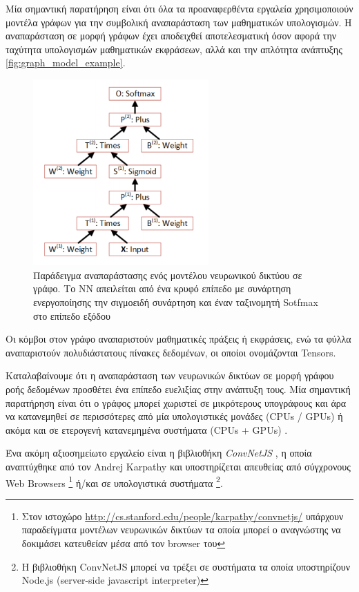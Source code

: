 Μία σημαντική παρατήρηση είναι ότι όλα τα προαναφερθέντα εργαλεία χρησιμοποιούν μοντέλα γράφων
για την συμβολική αναπαράσταση των μαθηματικών υπολογισμών. Η αναπαράσταση σε μορφή γράφων
έχει αποδειχθεί αποτελεσματική όσον αφορά την ταχύτητα υπολογισμών μαθηματικών εκφράσεων, αλλά και την
απλότητα ανάπτυξης \autoref{fig:graph_model_example}.

\begin{figure}[!ht]
  \centering
  \includegraphics[width=0.6\textwidth]{./images/chapter4/graph_model_example.png}
  \caption[Παράδειγμα αναπαράστασης ενός μοντέλου νευρωνικού δικτύου σε γράφο.
    Το ΝΝ αποτλείται από ένα κρυφό επίπεδο
    και ένα ταξινομητή Sotfmax στο επίπεδο εξόδου]{
    Παράδειγμα αναπαράστασης ενός μοντέλου νευρωνικού δικτύου σε γράφο.
    Το ΝΝ απειλείται από ένα κρυφό επίπεδο με συνάρτηση ενεργοποίησης την σιγμοειδή συνάρτηση
    και έναν ταξινομητή Sotfmax στο επίπεδο εξόδου}
  \label{fig:graph_model_example}
\end{figure}
Οι κόμβοι στον γράφο αναπαριστούν μαθηματικές πράξεις ή εκφράσεις, ενώ τα φύλλα
αναπαριστούν πολυδιάστατους πίνακες δεδομένων, οι οποίοι ονομάζονται Tensors.

Καταλαβαίνουμε ότι η αναπαράσταση των νευρωνικών δικτύων σε μορφή γράφου ροής
δεδομένων προσθέτει ένα επίπεδο ευελιξίας στην ανάπτυξη τους. Μία σημαντική παρατήρηση
είναι ότι ο γράφος μπορεί χωριστεί σε μικρότερους υπογράφους και άρα να κατανεμηθεί
σε περισσότερες από μία υπολογιστικές μονάδες (CPUs / GPUs) ή ακόμα και
σε ετερογενή κατανεμημένα συστήματα (CPUs + GPUs) \cite{DBLP:journals/corr/AbadiABBCCCDDDG16} .

Ένα ακόμη αξιοσημείωτο εργαλείο είναι η βιβλιοθήκη \emph{ConvNetJS} \cite{karpathy2014convnetjs},
η οποία αναπτύχθηκε από τον Andrej Karpathy και υποστηρίζεται απευθείας από σύγχρονους
Web Browsers
\footnote{Στον ιστοχώρο \href{http://cs.stanford.edu/people/karpathy/convnetjs/}{http://cs.stanford.edu/people/karpathy/convnetjs/}
υπάρχουν παραδείγματα μοντέλων νευρωνικών δικτύων τα οποία μπορεί ο αναγνώστης να δοκιμάσει
κατευθείαν μέσα από τον browser του}
ή/και σε υπολογιστικά συστήματα
\footnote{Η βιβλιοθήκη ConvNetJS μπορεί να τρέξει σε συστήματα τα οποία
υποστηρίζουν Node.js (server-side javascript interpreter)}.

